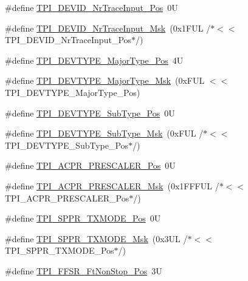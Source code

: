 \begin{DoxyCompactItemize}
\item 
\#define \hyperlink{group___c_m_s_i_s___t_p_i_ga80ecae7fec479e80e583f545996868ed}{T\-P\-I\-\_\-\-D\-E\-V\-I\-D\-\_\-\-Nr\-Trace\-Input\-\_\-\-Pos}~0\-U
\item 
\#define \hyperlink{group___c_m_s_i_s___t_p_i_gabed454418d2140043cd65ec899abd97f}{T\-P\-I\-\_\-\-D\-E\-V\-I\-D\-\_\-\-Nr\-Trace\-Input\-\_\-\-Msk}~(0x1\-F\-U\-L /$\ast$$<$$<$ T\-P\-I\-\_\-\-D\-E\-V\-I\-D\-\_\-\-Nr\-Trace\-Input\-\_\-\-Pos$\ast$/)
\item 
\#define \hyperlink{group___c_m_s_i_s___t_p_i_ga69c4892d332755a9f64c1680497cebdd}{T\-P\-I\-\_\-\-D\-E\-V\-T\-Y\-P\-E\-\_\-\-Major\-Type\-\_\-\-Pos}~4\-U
\item 
\#define \hyperlink{group___c_m_s_i_s___t_p_i_gaecbceed6d08ec586403b37ad47b38c88}{T\-P\-I\-\_\-\-D\-E\-V\-T\-Y\-P\-E\-\_\-\-Major\-Type\-\_\-\-Msk}~(0x\-F\-U\-L $<$$<$ T\-P\-I\-\_\-\-D\-E\-V\-T\-Y\-P\-E\-\_\-\-Major\-Type\-\_\-\-Pos)
\item 
\#define \hyperlink{group___c_m_s_i_s___t_p_i_ga0c799ff892af5eb3162d152abc00af7a}{T\-P\-I\-\_\-\-D\-E\-V\-T\-Y\-P\-E\-\_\-\-Sub\-Type\-\_\-\-Pos}~0\-U
\item 
\#define \hyperlink{group___c_m_s_i_s___t_p_i_ga5b2fd7dddaf5f64855d9c0696acd65c1}{T\-P\-I\-\_\-\-D\-E\-V\-T\-Y\-P\-E\-\_\-\-Sub\-Type\-\_\-\-Msk}~(0x\-F\-U\-L /$\ast$$<$$<$ T\-P\-I\-\_\-\-D\-E\-V\-T\-Y\-P\-E\-\_\-\-Sub\-Type\-\_\-\-Pos$\ast$/)
\item 
\#define \hyperlink{group___c_m_s_i_s___t_p_i_ga5a82d274eb2df8b0c92dd4ed63535928}{T\-P\-I\-\_\-\-A\-C\-P\-R\-\_\-\-P\-R\-E\-S\-C\-A\-L\-E\-R\-\_\-\-Pos}~0\-U
\item 
\#define \hyperlink{group___c_m_s_i_s___t_p_i_ga4fcacd27208419929921aec8457a8c13}{T\-P\-I\-\_\-\-A\-C\-P\-R\-\_\-\-P\-R\-E\-S\-C\-A\-L\-E\-R\-\_\-\-Msk}~(0x1\-F\-F\-F\-U\-L /$\ast$$<$$<$ T\-P\-I\-\_\-\-A\-C\-P\-R\-\_\-\-P\-R\-E\-S\-C\-A\-L\-E\-R\-\_\-\-Pos$\ast$/)
\item 
\#define \hyperlink{group___c_m_s_i_s___t_p_i_ga0f302797b94bb2da24052082ab630858}{T\-P\-I\-\_\-\-S\-P\-P\-R\-\_\-\-T\-X\-M\-O\-D\-E\-\_\-\-Pos}~0\-U
\item 
\#define \hyperlink{group___c_m_s_i_s___t_p_i_gaca085c8a954393d70dbd7240bb02cc1f}{T\-P\-I\-\_\-\-S\-P\-P\-R\-\_\-\-T\-X\-M\-O\-D\-E\-\_\-\-Msk}~(0x3\-U\-L /$\ast$$<$$<$ T\-P\-I\-\_\-\-S\-P\-P\-R\-\_\-\-T\-X\-M\-O\-D\-E\-\_\-\-Pos$\ast$/)
\item 
\#define \hyperlink{group___c_m_s_i_s___t_p_i_ga9537b8a660cc8803f57cbbee320b2fc8}{T\-P\-I\-\_\-\-F\-F\-S\-R\-\_\-\-Ft\-Non\-Stop\-\_\-\-Pos}~3\-U
$$
\end{DoxyCompactItemize}
